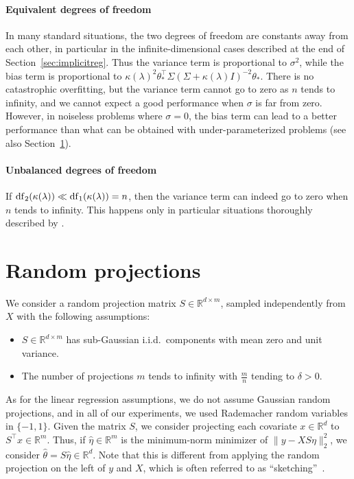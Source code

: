 \documentclass[11pt]{article}
\newcommand{\BIT}{\begin{itemize}}
\newcommand{\EIT}{\end{itemize}}
\newcommand{\idm}{I}
\newcommand{\rb}{\mathbb{R}}
\newcommand{\mysec}[1]{Section~\ref{sec:#1}}
\def \S{  { \Sigma} }
\begin{document}
\paragraph{Equivalent degrees of freedom} In many standard situations, the two degrees of freedom are constants away from each other, in particular in the infinite-dimensional cases described at the end of \mysec{implicitreg}. Thus the variance term is proportional to $\sigma^2$, while the bias term is proportional to
$\kappa(\lambda)^2 \theta_\ast ^\top \S ( \S + \kappa(\lambda) \idm)^{-2} \theta_\ast$. There is no catastrophic overfitting, but the variance term cannot go to zero as $n$ tends to infinity, and we cannot expect a good performance when $\sigma$ is far from zero. However, in noiseless problems where $\sigma=0$, the bias term can lead to a better performance than what can be obtained with under-parameterized problems (see also \mysec{rp}).

\paragraph{Unbalanced degrees of freedom} If ${\rm df}_2(\kappa(\lambda)) \ll {\rm df}_1(\kappa(\lambda)) = n$, then the variance term can indeed go to zero when $n$ tends to infinity. This happens only in particular situations thoroughly described by \cite{bartlett2020benign,hastie2019surprises,richards2021asymptotics}. 

 
\section{Random projections}
\label{sec:rp}

We consider a random projection matrix $S \in \rb^{d \times m}$, sampled independently from $X$ with the following assumptions:
\BIT
\item[\textbf{(A5)}] $S \in \rb^{d\times m}$ has sub-Gaussian i.i.d.~components with mean zero and unit variance.
\item[\textbf{(A6)}] The number of projections $m$ tends to infinity with $  \frac{m}{n}$ tending to $\delta > 0$.
\EIT
As for the linear regression assumptions, we do not assume Gaussian random projections, and in all of our experiments, we used Rademacher random variables in $\{-1,1\}$. Given the matrix $S$, we consider projecting each covariate $x \in \rb^d$ to $S^\top x \in \rb^m$. Thus, if $\hat{\eta} \in \rb^m$ is the minimum-norm minimizer of $\| y - X S \eta\|_2^2$, we consider $\hat{\theta} = S \hat{\eta} \in \rb^d$. Note that this is different from applying the random projection on the left of $y$ and $X$, which is often referred to as ``sketching''~\cite{dobriban2019asymptotics,raskutti2016statistical}.
\end{document}
